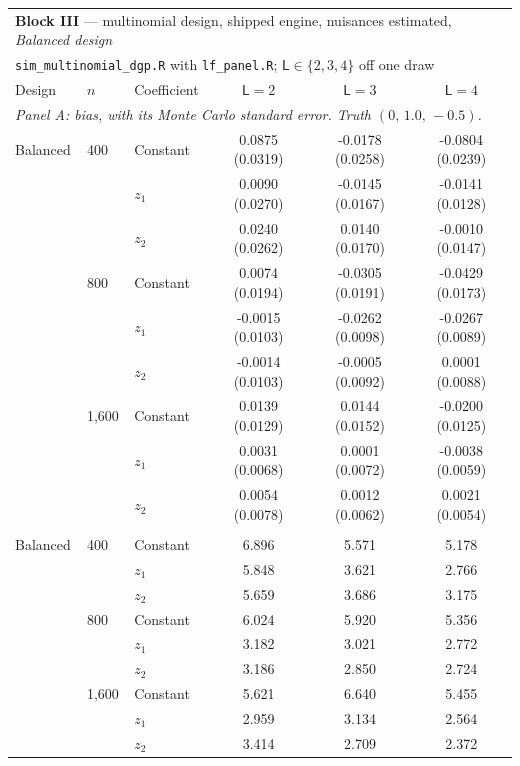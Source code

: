\begin{tabular}{lllccc}
\toprule
\multicolumn{6}{l}{\textbf{Block III} --- multinomial design, shipped engine, nuisances estimated, \emph{Balanced design}} \\
\multicolumn{6}{l}{\quad \texttt{sim\_multinomial\_dgp.R} with \texttt{lf\_panel.R}; $\mathsf L\in\{2,3,4\}$ off one draw} \\
\midrule
Design & $n$ & Coefficient & $\mathsf L=2$ & $\mathsf L=3$ & $\mathsf L=4$ \\
\midrule
\multicolumn{6}{l}{\textit{Panel A: bias, with its Monte Carlo standard error.  Truth $(0,\,1.0,\,-0.5)$.}} \\
\midrule
Balanced & 400 & Constant & 0.0875 (0.0319) & -0.0178 (0.0258) & -0.0804 (0.0239) \\
 &  & $z_1$ & 0.0090 (0.0270) & -0.0145 (0.0167) & -0.0141 (0.0128) \\
 &  & $z_2$ & 0.0240 (0.0262) & 0.0140 (0.0170) & -0.0010 (0.0147) \\
 & 800 & Constant & 0.0074 (0.0194) & -0.0305 (0.0191) & -0.0429 (0.0173) \\
 &  & $z_1$ & -0.0015 (0.0103) & -0.0262 (0.0098) & -0.0267 (0.0089) \\
 &  & $z_2$ & -0.0014 (0.0103) & -0.0005 (0.0092) & 0.0001 (0.0088) \\
 & 1,600 & Constant & 0.0139 (0.0129) & 0.0144 (0.0152) & -0.0200 (0.0125) \\
 &  & $z_1$ & 0.0031 (0.0068) & 0.0001 (0.0072) & -0.0038 (0.0059) \\
 &  & $z_2$ & 0.0054 (0.0078) & 0.0012 (0.0062) & 0.0021 (0.0054) \\
\addlinespace
\multicolumn{6}{l}{\textit{Panel B: $\sqrt n\times$ s.d., which the theorem makes constant in $n$.}} \\
\midrule
Balanced & 400 & Constant & 6.896 & 5.571 & 5.178 \\
 &  & $z_1$ & 5.848 & 3.621 & 2.766 \\
 &  & $z_2$ & 5.659 & 3.686 & 3.175 \\
 & 800 & Constant & 6.024 & 5.920 & 5.356 \\
 &  & $z_1$ & 3.182 & 3.021 & 2.772 \\
 &  & $z_2$ & 3.186 & 2.850 & 2.724 \\
 & 1,600 & Constant & 5.621 & 6.640 & 5.455 \\
 &  & $z_1$ & 2.959 & 3.134 & 2.564 \\
 &  & $z_2$ & 3.414 & 2.709 & 2.372 \\

\end{tabular}
